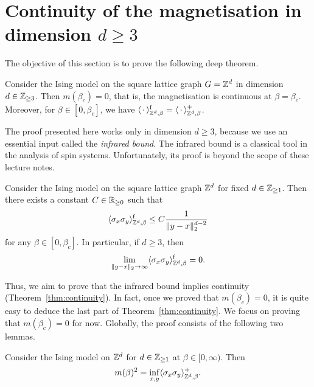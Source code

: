 \section{Continuity of the magnetisation in dimension $d\geq 3$}

The objective of this section is to prove the following deep theorem.

\begin{theorem}
    \label{thm:continuity}
    Consider the Ising model on the square lattice graph $G=\mathbb Z^d$
    in dimension $d\in\mathbb Z_{\geq 3}$.
    Then $m(\beta_c)=0$,
    that is, the magnetisation is continuous at $\beta=\beta_c$.
    Moreover, for $\beta\in[0,\beta_c]$,
    we have $\langle\,\cdot\,\rangle^{\operatorname{f}}_{\mathbb Z^d,\beta}=\langle\,\cdot\,\rangle^+_{\mathbb Z^d,\beta}$.
\end{theorem}

The proof presented here works only in dimension $d\geq 3$,
because we use an essential input called the \emph{infrared bound}.
The infrared bound is a classical tool in the analysis of spin systems.
Unfortunately, its proof is beyond the scope of these lecture notes.

\begin{theorem}
    Consider the Ising model on the square lattice graph $\mathbb Z^d$ for fixed $d\in\mathbb Z_{\geq 1}$.
    Then there exists a constant $C\in\mathbb R_{\geq 0}$ such that
    \[
        \langle\sigma_x\sigma_y\rangle_{\mathbb Z^d,\beta}^{\operatorname{f}}
        \leq C\frac1{\|y-x\|_2^{d-2}}
    \]
    for any $\beta\in[0,\beta_c]$.
    In particular, if $d\geq 3$,
    then
    \begin{equation}
        \label{eq:infrared_simple_decay}
        \lim_{\|y-x\|_2\to\infty}\langle\sigma_x\sigma_y\rangle_{\Z^d,\beta}^\f=0.
    \end{equation}
\end{theorem}

Thus, we aim to prove that the infrared bound implies continuity (Theorem~\ref{thm:continuity}).
In fact, once we proved that $m(\beta_c)=0$,
it is quite easy to deduce the last part of Theorem~\ref{thm:continuity}.
We focus on proving that $m(\beta_c)=0$ for now.
Globally, the proof consists of the following two lemmas.

\begin{lemma}
    Consider the Ising model on $\mathbb Z^d$ for $d\in\mathbb Z_{\geq 1}$ at $\beta\in[0,\infty)$.
    Then
    \[
        m(\beta)^2=\inf_{x,y}\langle\sigma_x\sigma_y\rangle_{\mathbb Z^d,\beta}^+.
    \]
\end{lemma}

